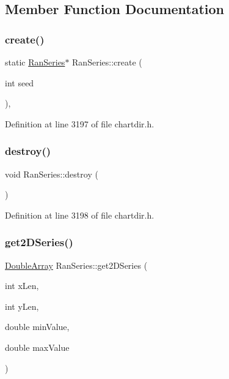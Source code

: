 \subsection{Member Function Documentation}
\mbox{\label{class_ran_series_afddf071c89ed954534354ab536ccaf9a}} 
\subsubsection{\texorpdfstring{create()}{create()}}
{\footnotesize\ttfamily static \hyperlink{class_ran_series}{Ran\+Series}$\ast$ Ran\+Series\+::create (\begin{DoxyParamCaption}\item[{int}]{seed }\end{DoxyParamCaption})\hspace{0.3cm}{\ttfamily [inline]}, {\ttfamily [static]}}



Definition at line 3197 of file chartdir.\+h.

\mbox{\label{class_ran_series_aa320bcef53d02417fdb78efe9033c29d}} 
\subsubsection{\texorpdfstring{destroy()}{destroy()}}
{\footnotesize\ttfamily void Ran\+Series\+::destroy (\begin{DoxyParamCaption}{ }\end{DoxyParamCaption})\hspace{0.3cm}{\ttfamily [inline]}}



Definition at line 3198 of file chartdir.\+h.

\mbox{\label{class_ran_series_abfabe60593b246b272936f3e74a73673}} 
\subsubsection{\texorpdfstring{get2\+D\+Series()}{get2DSeries()}}
{\footnotesize\ttfamily \hyperlink{class_double_array}{Double\+Array} Ran\+Series\+::get2\+D\+Series (\begin{DoxyParamCaption}\item[{int}]{x\+Len,  }\item[{int}]{y\+Len,  }\item[{double}]{min\+Value,  }\item[{double}]{max\+Value }\end{DoxyParamCaption})\hspace{0.3cm}{\ttfamily [inline]}}



